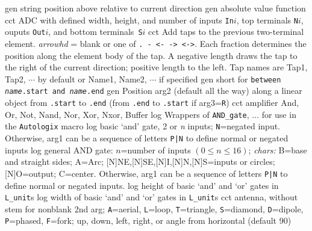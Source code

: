 \vspace{\abovedisplayskip}
\noindent
{}
  {gen}
  {string position above relative to current direction}
  {gen}
  {absolute value function}
  {cct}
  {ADC with defined width, height, and number of inputs {\tt In$i$},
    top terminals {\tt N$i$}, ouputs {\tt Out$i$},
    and bottom terminals~{\tt S$i$}}
  {cct}
  {Add taps to the previous two-terminal element.
   {\sl arrowhd} = blank or one of {\tt . - <- -> <->}.
   Each fraction determines the position along the element body of the tap.
   A negative length draws the tap to the right of the current
   direction; positive length to the left.
   Tap names are Tap1, Tap2, $\cdots$ by default  or
   Name1, Name2, $\cdots$ if specified 
   }
  {gen}
  {short for {\tt between {\sl name}.start and {\sl name}.end}}
  {gen}
  {Position arg2 (default all the way) along a linear object
   from {\tt .start} to {\tt .end}
   (from {\tt .end} to {\tt .start} if arg3={\tt R}) }
  {cct}
  {amplifier}
%
 {And, Or, Not, Nand, Nor, Xor, Nxor, Buffer}{}
  {log}
  {Wrappers of {\tt AND\_gate}, $\ldots$ for use in the {\tt Autologix}
   macro}
  {log}
  {basic `and' gate, 2 or {\sl n\/} inputs; {\tt N}=negated input.
   Otherwise, arg1 can be a sequence of letters {\tt P|N}
   to define normal or negated inputs
    }
  {log}
  {general AND gate: $n$=number of inputs $(0\leq n\leq 16)$;
           {\sl chars:}
           B=base and straight sides; A=Arc;
           [N]NE,[N]SE,[N]I,[N]N,[N]S=inputs or circles;
           [N]O=output; C=center.
   Otherwise, arg1 can be a sequence of letters {\tt P|N}
   to define normal or negated inputs.}
  {log}
  {height of basic `and' and `or' gates in {\tt L\_unit}s}
  {log}
  {width of basic `and' and `or' gates in {\tt L\_unit}s}
  {cct}
  {antenna, without stem for nonblank 2nd arg; {\tt A}=aerial,
    {\tt L}=loop, {\tt T}=triangle, {\tt S}=diamond, {\tt D}=dipole,
    {\tt P}=phased, {\tt F}=fork;
    up, down, left, right, or angle from horizontal (default 90) 
   }

